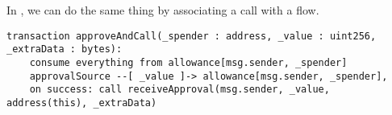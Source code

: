 \documentclass[10pt]{article}
\begin{document}
In \langName, we can do the same thing by associating a call with a flow.
\begin{lstlisting}
transaction approveAndCall(_spender : address, _value : uint256, _extraData : bytes):
    consume everything from allowance[msg.sender, _spender]
    approvalSource --[ _value ]-> allowance[msg.sender, _spender],
    on success: call receiveApproval(msg.sender, _value, address(this), _extraData)
\end{lstlisting}
\end{document}
